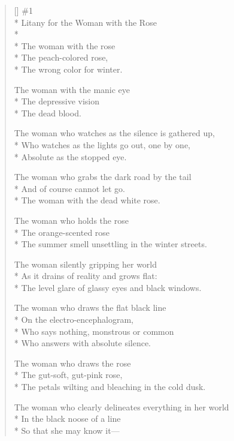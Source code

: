 \label{ch:litanies}
\settowidth{\versewidth}{She is the woman who draws the charcoal rose on brown paper.}
\begin{verse}[\versewidth]
\#1\\*
Litany for the Woman with the Rose\\*
~\\*
The woman with the rose\\*
The peach-colored rose,\\*
The wrong color for winter.

The woman with the manic eye\\*
The depressive vision\\*
The dead blood.

The woman who watches as the silence is gathered up,\\*
Who watches as the lights go out, one by one,\\*
Absolute as the stopped eye.

The woman who grabs the dark road by the tail\\*
And of course cannot let go.\\*
The woman with the dead white rose.

\starbreak

The woman who holds the rose\\*
The orange-scented rose\\*
The summer smell unsettling in the winter streets.

The woman silently gripping her world\\*
As it drains of reality and grows flat:\\*
The level glare of glassy eyes and black windows.

The woman who draws the flat black line\\*
On the electro-encephalogram,\\*
Who says nothing, monstrous or common\\*
Who answers with absolute silence.

\starbreak

The woman who draws the rose\\*
The gut-soft, gut-pink rose,\\*
The petals wilting and bleaching in the cold dusk.

The woman who clearly delineates everything in her world\\*
In the black noose of a line\\*
So that she may know it---


\end{verse}
